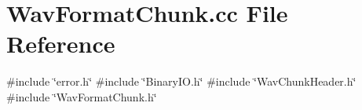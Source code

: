 \section{Wav\+Format\+Chunk.\+cc File Reference}
\label{WavFormatChunk_8cc}
{\ttfamily \#include \char`\"{}error.\+h\char`\"{}}\newline
{\ttfamily \#include \char`\"{}Binary\+I\+O.\+h\char`\"{}}\newline
{\ttfamily \#include \char`\"{}Wav\+Chunk\+Header.\+h\char`\"{}}\newline
{\ttfamily \#include \char`\"{}Wav\+Format\+Chunk.\+h\char`\"{}}\newline

